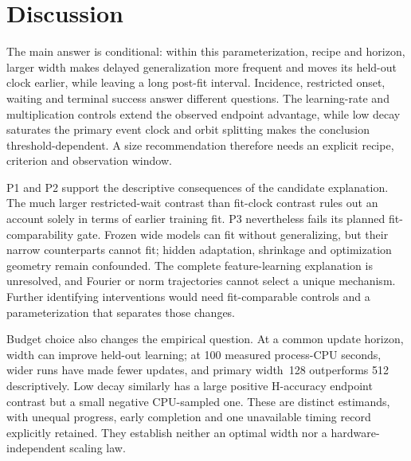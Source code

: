 \section{Discussion}
\label{sec:discussion}
The main answer is conditional: within this parameterization, recipe and horizon, larger width makes delayed generalization more frequent and moves its held-out clock earlier, while leaving a long post-fit interval. Incidence, restricted onset, waiting and terminal success answer different questions. The learning-rate and multiplication controls extend the observed endpoint advantage, while low decay saturates the primary event clock and orbit splitting makes the conclusion threshold-dependent. A size recommendation therefore needs an explicit recipe, criterion and observation window.

P1 and P2 support the descriptive consequences of the candidate explanation. The much larger restricted-wait contrast than fit-clock contrast rules out an account solely in terms of earlier training fit. P3 nevertheless fails its planned fit-comparability gate. Frozen wide models can fit without generalizing, but their narrow counterparts cannot fit; hidden adaptation, shrinkage and optimization geometry remain confounded. The complete feature-learning explanation is unresolved, and Fourier or norm trajectories cannot select a unique mechanism. Further identifying interventions would need fit-comparable controls and a parameterization that separates those changes.

Budget choice also changes the empirical question. At a common update horizon, width can improve held-out learning; at 100 measured process-CPU seconds, wider runs have made fewer updates, and primary width~128 outperforms 512 descriptively. Low decay similarly has a large positive H-accuracy endpoint contrast but a small negative CPU-sampled one. These are distinct estimands, with unequal progress, early completion and one unavailable timing record explicitly retained. They establish neither an optimal width nor a hardware-independent scaling law.
